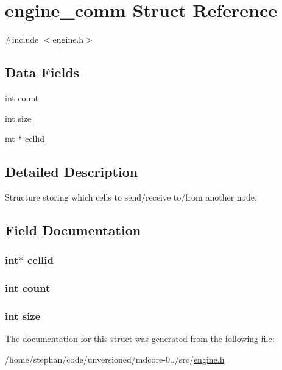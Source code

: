 \hypertarget{structengine__comm}{\section{engine\-\_\-comm Struct Reference}
\label{structengine__comm}
}


{\ttfamily \#include $<$engine.\-h$>$}

\subsection*{Data Fields}
\begin{DoxyCompactItemize}
\item 
int \hyperlink{structengine__comm_ad43c3812e6d13e0518d9f8b8f463ffcf}{count}
\item 
int \hyperlink{structengine__comm_a439227feff9d7f55384e8780cfc2eb82}{size}
\item 
int $\ast$ \hyperlink{structengine__comm_ae3e9be43b8b961b8e8bf5ff01670b75e}{cellid}
\end{DoxyCompactItemize}


\subsection{Detailed Description}
Structure storing which cells to send/receive to/from another node. 

\subsection{Field Documentation}
\hypertarget{structengine__comm_ae3e9be43b8b961b8e8bf5ff01670b75e}{
\subsubsection[{cellid}]{\setlength{\rightskip}{0pt plus 5cm}int$\ast$ cellid}}\label{structengine__comm_ae3e9be43b8b961b8e8bf5ff01670b75e}
\hypertarget{structengine__comm_ad43c3812e6d13e0518d9f8b8f463ffcf}{
\subsubsection[{count}]{\setlength{\rightskip}{0pt plus 5cm}int count}}\label{structengine__comm_ad43c3812e6d13e0518d9f8b8f463ffcf}
\hypertarget{structengine__comm_a439227feff9d7f55384e8780cfc2eb82}{
\subsubsection[{size}]{\setlength{\rightskip}{0pt plus 5cm}int size}}\label{structengine__comm_a439227feff9d7f55384e8780cfc2eb82}


The documentation for this struct was generated from the following file\-:\begin{DoxyCompactItemize}
\item 
/home/stephan/code/unversioned/mdcore-\/0../src/\hyperlink{engine_8h}{engine.\-h}\end{DoxyCompactItemize}

